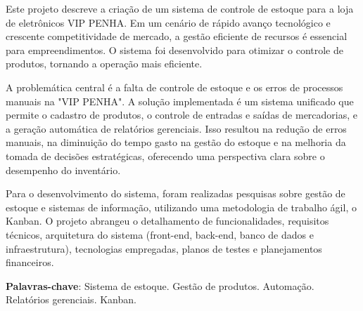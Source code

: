 \documentclass[
	12pt,				%
	openany,			%
	twoside,			%
	a4paper,			%
	english,			%
	brazil				%
	]{abntex2}
\begin{document}
\setlength{\absparsep}{18pt} %
\begin{resumo}
Este projeto descreve a criação de um sistema de controle de estoque para a loja de eletrônicos VIP PENHA. Em um cenário de rápido avanço tecnológico e crescente competitividade de mercado, a gestão eficiente de recursos é essencial para empreendimentos. O sistema foi desenvolvido para otimizar o controle de produtos, tornando a operação mais eficiente. 

A problemática central é a falta de controle de estoque e os erros de processos manuais na "VIP PENHA". A solução implementada é um sistema unificado que permite o cadastro de produtos, o controle de entradas e saídas de mercadorias, e a geração automática de relatórios gerenciais. Isso resultou na redução de erros manuais, na diminuição do tempo gasto na gestão do estoque e na melhoria da tomada de decisões estratégicas, oferecendo uma perspectiva clara sobre o desempenho do inventário. 

Para o desenvolvimento do sistema, foram realizadas pesquisas sobre gestão de estoque e sistemas de informação, utilizando uma metodologia de trabalho ágil, o Kanban. O projeto abrangeu o detalhamento de funcionalidades, requisitos técnicos, arquitetura do sistema (front-end, back-end, banco de dados e infraestrutura), tecnologias empregadas, planos de testes e planejamentos financeiros.


 \textbf{Palavras-chave}: Sistema de estoque. Gestão de produtos. Automação. Relatórios gerenciais. Kanban. 
\end{resumo}
\end{document}
